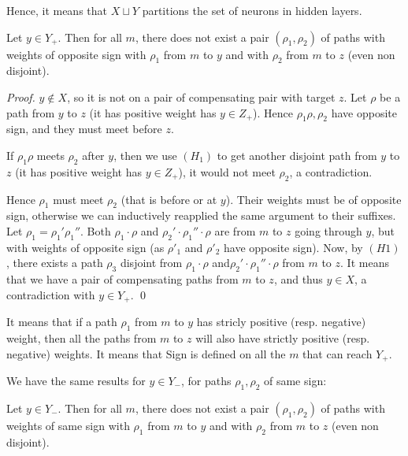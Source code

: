 Hence, it means that $X \sqcup Y$ partitions the set of neurons in hidden layers.
			
\begin{lemma}
	\label{lemma10}
		Let $y \in Y_+$. Then for all $m$, there does not exist a pair $(\rho_1,\rho_2)$ 
		of paths  with weights of opposite sign with $\rho_1$ from $m$ to $y$ and 
		with $\rho_2$ from $m$ to $z$ (even non disjoint).
\end{lemma}

\begin{proof}
  $y \notin X$, so it is not on a pair of compensating pair with target $z$.
  Let $\rho$ be a path from $y$ to $z$ (it has positive weight has $y \in Z_+$).
  Hence $\rho_1 \rho, \rho_2$ have opposite sign, and they must meet before $z$.

  If $\rho_1 \rho$ meets $\rho_2$ after $y$, then we use $(H_1)$ to get another disjoint path from $y$ to $z$ (it has positive weight has $y \in Z_+$), it would not meet $\rho_2$, a contradiction.

  Hence $\rho_1$ must meet $\rho_2$ (that is before or at $y$).
  Their weights must be of opposite sign, otherwise we can inductively reapplied the same argument to their suffixes.
  Let $\rho_1=\rho_1'\rho_1''$.
  Both $\rho_1 \cdot \rho$ and $\rho_2' \cdot \rho_1'' \cdot \rho$
  are from $m$ to $z$ going through $y$, but with weights of opposite sign (as $\rho'_1$ and $\rho'_2$ have opposite sign).
  Now, by $(H1)$, there exists a path $\rho_3$ disjoint from $\rho_1 \cdot \rho$ and$\rho_2' \cdot \rho_1'' \cdot \rho$ from $m$ to $z$. It means that we have a pair of compensating paths from $m$ to $z$, and thus $y \in X$, a contradiction with $y \in Y_+$. \qed
\end{proof}

It means that if a path $\rho_1$ from $m$ to $y$ has stricly positive (resp. negative) weight, then all the paths from $m$ to $z$ will also have strictly positive (resp. negative) weights. It means that Sign is defined on all the $m$ that can reach $Y_+$.

We have the same results for $y \in Y_-$, for paths $\rho_1, \rho_2$ of same sign:

\begin{lemma}
	\label{lemma11}
	Let $y \in Y_-$. Then for all $m$, there does not exist a pair $(\rho_1,\rho_2)$ 
	of paths with weights of same sign with $\rho_1$ from $m$ to $y$ and 
	with $\rho_2$ from $m$ to $z$ (even non disjoint).
\end{lemma}

